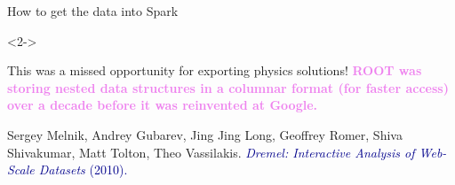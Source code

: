 \documentclass[aspectratio=169]{beamer}
\begin{document}
\begin{frame}{How to get the data into Spark}
\begin{uncoverenv}<2->
\vspace{-5.2 cm}
\begin{center}
\end{center}
\vspace{5 cm}
\end{uncoverenv}
\end{frame}

\begin{frame}{This was a missed opportunity for exporting physics solutions!}
\vspace{0.5 cm}
\large \textcolor{violet}{\bf ROOT was storing nested data structures in a columnar format (for faster access) over a decade before it was reinvented at Google.}

\vspace{-0.3 cm}
\begin{center}
\begin{minipage}{0.8\linewidth}
\vspace{0.5 cm}
\small Sergey Melnik, Andrey Gubarev, Jing Jing Long, Geoffrey Romer, Shiva Shivakumar, Matt Tolton, Theo Vassilakis. \textcolor{darkblue}{\normalsize {\it Dremel: Interactive Analysis of Web-Scale Datasets} (2010).}

\vspace{0.25 cm}
\end{minipage}
\end{center}
\end{frame}
\end{document}
